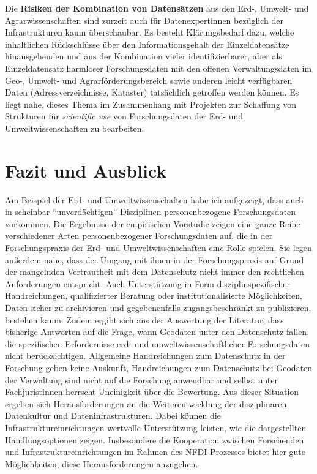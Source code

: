 \documentclass[a4paper,
fontsize=11pt,
oneside,
numbers=noperiodatend,
parskip=half-,
bibliography=totoc,
final
]{scrartcl}
\begin{document}
Die \textbf{Risiken der Kombination von Datensätzen} aus den Erd-,
Umwelt- und Agrarwissenschaften sind zurzeit auch für Datenexpertinnen
bezüglich der Infrastrukturen kaum überschaubar. Es besteht
Klärungsbedarf dazu, welche inhaltlichen Rückschlüsse über den
Informationsgehalt der Einzeldatensätze hinausgehenden und aus der
Kombination vieler identifizierbarer, aber als Einzeldatensatz harmloser
Forschungsdaten mit den offenen Verwaltungsdaten im Geo-, Umwelt- und
Agrarförderungsbereich sowie anderen leicht verfügbaren Daten
(Adressverzeichnisse, Kataster) tatsächlich getroffen werden können. Es
liegt nahe, dieses Thema im Zusammenhang mit Projekten zur Schaffung von
Strukturen für \emph{scientific use} von Forschungsdaten der Erd- und
Umweltwissenschaften zu bearbeiten.

\hypertarget{fazit-und-ausblick}{%
\section{Fazit und Ausblick}\label{fazit-und-ausblick}}

Am Beispiel der Erd- und Umweltwissenschaften habe ich aufgezeigt, dass
auch in scheinbar \enquote{unverdächtigen} Disziplinen personenbezogene
Forschungsdaten vorkommen. Die Ergebnisse der empirischen Vorstudie
zeigen eine ganze Reihe verschiedener Arten personenbezogener
Forschungsdaten auf, die in der Forschungspraxis der Erd- und
Umweltwissenschaften eine Rolle spielen. Sie legen außerdem nahe, dass
der Umgang mit ihnen in der Forschungspraxis auf Grund der mangelnden
Vertrautheit mit dem Datenschutz nicht immer den rechtlichen
Anforderungen entspricht. Auch Unterstützung in Form
disziplinspezifischer Handreichungen, qualifizierter Beratung oder
institutionalisierte Möglichkeiten, Daten sicher zu archivieren und
gegebenenfalls zugangsbeschränkt zu publizieren, bestehen kaum. Zudem
ergibt sich aus der Auswertung der Literatur, dass bisherige Antworten
auf die Frage, wann Geodaten unter den Datenschutz fallen, die
spezifischen Erfordernisse erd- und umweltwissenschaftlicher
Forschungsdaten nicht berücksichtigen. Allgemeine Handreichungen zum
Datenschutz in der Forschung geben keine Auskunft, Handreichungen zum
Datenschutz bei Geodaten der Verwaltung sind nicht auf die Forschung
anwendbar und selbst unter Fachjuristinnen herrscht Uneinigkeit über die
Bewertung. Aus dieser Situation ergeben sich Herausforderungen an die
Weiterentwicklung der disziplinären Datenkultur und
Dateninfrastrukturen. Dabei können die Infrastruktureinrichtungen
wertvolle Unterstützung leisten, wie die dargestellten Handlungsoptionen
zeigen. Insbesondere die Kooperation zwischen Forschenden und
Infrastruktureinrichtungen im Rahmen des NFDI-Prozesses bietet hier gute
Möglichkeiten, diese Herausforderungen anzugehen.
\end{document}

